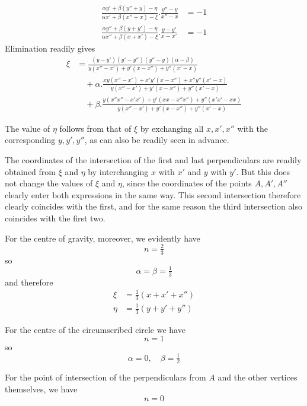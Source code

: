%
\[
\begin{aligned}
\tfrac{\alpha y'+\beta(y''+y)-\eta}{\alpha x'+\beta(x''+x)-\xi}.\tfrac{y''-y}{x''-x}&=-1\\
\tfrac{\alpha y''+\beta(y+y')-\eta}{\alpha x''+\beta(x+x')-\xi}.\tfrac{y-y'}{x-x'}&=-1
\end{aligned}
\]
Elimination readily gives
\[
\begin{aligned}
\xi&=\tfrac{(y-y')(y'-y'')(y''-y)(\alpha-\beta)}{y(x''-x')+y'(x-x'')+y''(x'-x)}\\
&\quad+\alpha.\tfrac{xy(x''-x')+x'y'(x-x'')+x''y''(x'-x)}{y(x''-x')+y'(x-x'')+y''(x'-x)}\\
&\quad+\beta.\tfrac{y(x''x''-x'x')+y'(xx-x''x'')+y''(x'x'-xx)}{y(x''-x')+y'(x-x'')+y''(x'-x)}
\end{aligned}
\]
\par
The value of \(\eta\) follows from that of \(\xi\) by exchanging all \(x,x',x''\) with the corresponding \(y,y',y''\), as can also be readily seen in advance.

The coordinates of the intersection of the first and last perpendiculars are readily obtained from \(\xi\) and \(\eta\) by interchanging \(x\) with \(x'\) and \(y\) with \(y'\). But this does not change the values of \(\xi\) and \(\eta\), since the coordinates of the points \(A,A',A''\) clearly enter both expressions in the same way. This second intersection therefore clearly coincides with the first, and for the same reason the third intersection also coincides with the first two.

For the centre of gravity, moreover, we evidently have
\[
n=\tfrac23
\]
so
\[
\alpha=\beta=\tfrac13
\]
and therefore
\[
\begin{aligned}\xi&=\tfrac13(x+x'+x'')\\\eta&=\tfrac13(y+y'+y'')\end{aligned}
\]
\par
For the centre of the circumscribed circle we have
\[
n=1
\]
so
\[
\alpha=0,\quad\beta=\tfrac12
\]
\par
For the point of intersection of the perpendiculars from \(A\) and the other vertices themselves, we have
\[
n=0
\]
